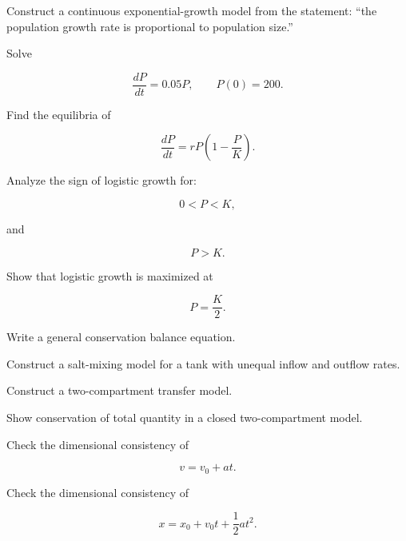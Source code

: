 \begin{exercise}[2]
Construct a continuous exponential-growth model from the statement:
``the population growth rate is proportional to population size.''
\end{exercise}

\begin{exercise}[2]
Solve

\[
\frac{dP}{dt}=0.05P,
\qquad
P(0)=200.
\]
\end{exercise}

\begin{exercise}[2]
Find the equilibria of

\[
\frac{dP}{dt}
=
rP
\left(
1-\frac{P}{K}
\right).
\]
\end{exercise}

\begin{exercise}[3]
Analyze the sign of logistic growth for:

\[
0<P<K,
\]

and

\[
P>K.
\]
\end{exercise}

\begin{exercise}[3]
Show that logistic growth is maximized at

\[
P=\frac{K}{2}.
\]
\end{exercise}

\begin{exercise}[2]
Write a general conservation balance equation.
\end{exercise}

\begin{exercise}[3]
Construct a salt-mixing model for a tank with unequal inflow and outflow
rates.
\end{exercise}

\begin{exercise}[3]
Construct a two-compartment transfer model.
\end{exercise}

\begin{exercise}[3]
Show conservation of total quantity in a closed two-compartment model.
\end{exercise}

\begin{exercise}[2]
Check the dimensional consistency of

\[
v=v_0+at.
\]
\end{exercise}

\begin{exercise}[2]
Check the dimensional consistency of

\[
x=x_0+v_0t+\frac12at^2.
\]
\end{exercise}

